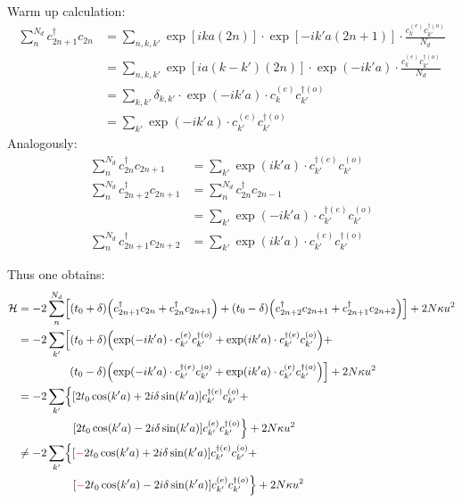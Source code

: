 Warm up calculation:
\begin{align*}
	\sum_n^{N_d}c_{2n+1}^\dagger c_{2n} &=\sum_{n, k, k'} \exp\left[ika(2n)\right] \cdot \exp\left[-ik'a(2n+1)\right] \cdot \frac{c_k^{(e)}c_{k'}^{\dagger(o)}}{N_d} \\
	&=\sum_{n, k, k'} \exp\left[ia(k-k')(2n)\right] \cdot \exp\left(-ik'a\right) \cdot  \frac{c_k^{(e)}c_{k'}^{\dagger(o)}}{N_d} \\
	&=\sum_{k, k'} \delta_{k, k'} \cdot \exp\left(-ik'a\right)\cdot c_k^{(e)}c_{k'}^{\dagger(o)}\\
	&=\sum_{k'} \exp\left(-ik'a\right) \cdot c_{k'}^{(e)}c_{k'}^{\dagger(o)}
\end{align*}
Analogously:
\begin{align*}
	\sum_n^{N_d} c_{2n}^\dagger c_{2n+1} &=\sum_{k'} \exp\left(ik'a\right)\cdot c_{k'}^{\dagger(e)}c_{k'}^{(o)}\\
	\sum_n^{N_d} c_{2n+2}^\dagger c_{2n+1} &= \sum_n^{N_d} c_{2n}^\dagger c_{2n-1}\\
	&=\sum_{k'} \exp\left(-ik'a\right)\cdot  c_{k'}^{\dagger(e)}c_{k'}^{(o)}\\
	\sum_n^{N_d} c_{2n+1}^\dagger c_{2n+2} &=\sum_{k'} \exp\left(ik'a\right)\cdot  c_{k'}^{(e)}c_{k'}^{\dagger(o)}
\end{align*}

Thus one obtains:
\begin{align}
	\mathcal{H} &= -2\sum_n^{N_d} \left[\left(t_0+\delta\right)\left(c_{2n+1}^\dagger c_{2n} + c_{2n}^\dagger c_{2n+1} \right) + 
	\left(t_0-\delta\right)\left(c_{2n+2}^\dagger c_{2n+1} + c_{2n+1}^\dagger c_{2n+2}\right)\right]+2N\kappa u^2\\
	&= -2\sum_{k'} \left[\left(t_0+\delta\right)\left(\exp\left(-ik'a\right) \cdot c_{k'}^{(e)}c_{k'}^{\dagger(o)} + \exp\left(ik'a\right)\cdot c_{k'}^{\dagger(e)}c_{k'}^{(o)}\right)+ \right.\nonumber\\
	&\hspace*{1.6cm}\left.\left(t_0-\delta\right)\left(\exp\left(-ik'a\right)\cdot  c_{k'}^{\dagger(e)}c_{k'}^{(o)}+\exp\left(ik'a\right)\cdot  c_{k'}^{(e)}c_{k'}^{\dagger(o)}\right)\right]+2N\kappa u^2\\
	&= -2\sum_{k'} \left\{\left[2t_0\cos(k'a) + 2i\delta\sin(k'a)\right]c_{k'}^{\dagger(e)}c_{k'}^{(o)} + \right.\nonumber\\
	&\hspace*{1.7cm}\left. \left[2t_0\cos(k'a)-2i\delta\sin(k'a)\right] c_{k'}^{(e)}c_{k'}^{\dagger(o)}\right\}+2N\kappa u^2\\
	&\neq-2\sum_{k'} \left\{\left[\textcolor{red}{-}2t_0\cos(k'a) + 2i\delta\sin(k'a)\right]c_{k'}^{\dagger(e)}c_{k'}^{(o)} + \right.\nonumber\\
	&\hspace*{1.7cm}\left. \left[\textcolor{red}{-}2t_0\cos(k'a)-2i\delta\sin(k'a)\right] c_{k'}^{(e)}c_{k'}^{\dagger(o)}\right\}+2N\kappa u^2
\end{align}

